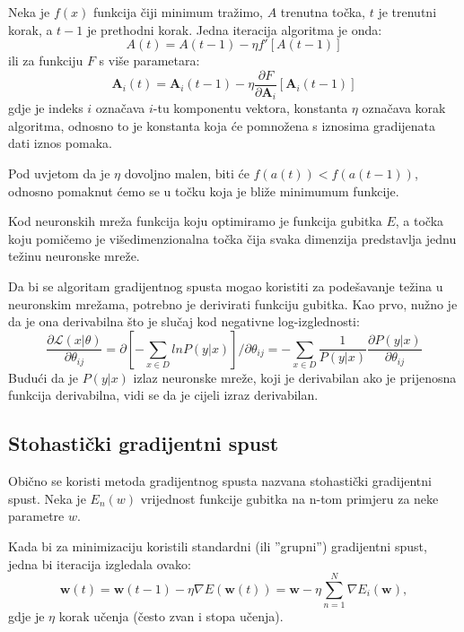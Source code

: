 \documentclass[times, utf8, diplomski, numeric]{fer}
\begin{document}
Neka je $f(x)$ funkcija čiji minimum tražimo, $A$ trenutna točka, $t$ je trenutni korak, a $t-1$ je prethodni korak. Jedna iteracija algoritma je onda:
\begin{equation}
  A(t) = A(t-1) - \eta f' \left[ A(t-1) \right]
\end{equation}
ili za funkciju $F$ s više parametara:
\begin{equation}
  \boldsymbol{A}_i(t) = \boldsymbol{A}_i(t-1) - \eta \frac{\partial F}{\partial \boldsymbol{A}_i} \left[ \boldsymbol{A}_i(t-1) \right]
\end{equation}
gdje je indeks $i$ označava $i$-tu komponentu vektora, konstanta $\eta$  označava korak algoritma, odnosno to je konstanta koja će pomnožena s iznosima gradijenata dati iznos pomaka.

Pod uvjetom da je $\eta$ dovoljno malen, biti će $f(a(t)) < f(a(t-1))$, odnosno pomaknut ćemo se u točku koja je bliže minimumum funkcije.

Kod neuronskih mreža funkcija koju optimiramo je funkcija gubitka $E$, a točka koju pomičemo je višedimenzionalna točka čija svaka dimenzija predstavlja jednu težinu neuronske mreže.

Da bi se algoritam gradijentnog spusta mogao koristiti za podešavanje težina u neuronskim mrežama, potrebno je derivirati funkciju gubitka. Kao prvo, nužno je da je ona derivabilna što je slučaj kod negativne log-izglednosti:
\begin{equation}
  \frac{\partial \mathcal{L}(x | \theta)}{\partial \theta_{ij}}
  	= \partial \left[ - \sum_{x \in D} ln P (y|x) \right] / \partial \theta_{ij}
    = - \sum_{x \in D} \frac{1}{P(y|x)} \frac{\partial P(y|x)}{\partial \theta_{ij}}
\end{equation}
Budući da je $P(y|x)$ izlaz neuronske mreže, koji je derivabilan ako je prijenosna funkcija derivabilna, vidi se da je cijeli izraz derivabilan.

\subsection{Stohastički gradijentni spust}

Obično se koristi metoda gradijentnog spusta nazvana stohastički gradijentni spust. Neka je $E_n(w)$ vrijednost funkcije gubitka na n-tom primjeru za neke parametre $w$.

Kada bi za minimizaciju koristili standardni (ili ''grupni'') gradijentni spust, jedna bi iteracija izgledala ovako:
\begin{equation}
    \boldsymbol{w}(t) = \boldsymbol{w}(t-1) - \eta \nabla E(\boldsymbol{w}(t)) = \boldsymbol{w} - \eta \sum_{n=1}^N \nabla E_i(\boldsymbol{w}),
\end{equation}
gdje je $\eta$ korak učenja (često zvan i stopa učenja).
\end{document}
